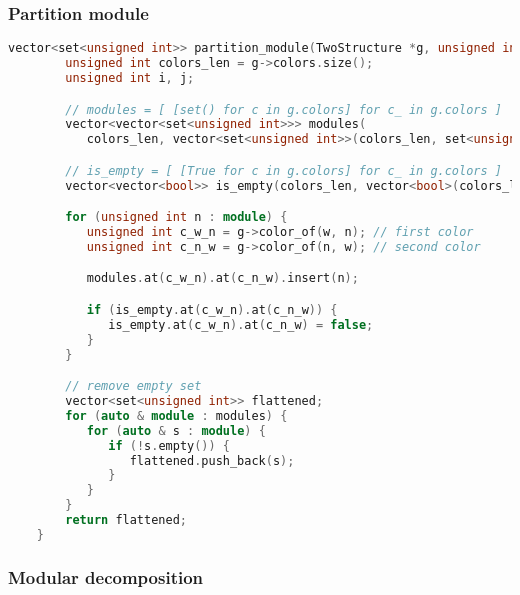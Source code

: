 \subsubsection{Partition module}

\begin{lstlisting}[language=C++, style=cpp, caption={Defining the Partition Module with C++}, label={lst:cpp-define-partition-module}, firstnumber=1]
    vector<set<unsigned int>> partition_module(TwoStructure *g, unsigned int w, const set<unsigned int>& module) {
        unsigned int colors_len = g->colors.size();
        unsigned int i, j;

        // modules = [ [set() for c in g.colors] for c_ in g.colors ]
        vector<vector<set<unsigned int>>> modules(
           colors_len, vector<set<unsigned int>>(colors_len, set<unsigned int>()));

        // is_empty = [ [True for c in g.colors] for c_ in g.colors ]
        vector<vector<bool>> is_empty(colors_len, vector<bool>(colors_len, true));

        for (unsigned int n : module) {
           unsigned int c_w_n = g->color_of(w, n); // first color
           unsigned int c_n_w = g->color_of(n, w); // second color

           modules.at(c_w_n).at(c_n_w).insert(n);

           if (is_empty.at(c_w_n).at(c_n_w)) {
              is_empty.at(c_w_n).at(c_n_w) = false;
           }
        }

        // remove empty set
        vector<set<unsigned int>> flattened;
        for (auto & module : modules) {
           for (auto & s : module) {
              if (!s.empty()) {
                 flattened.push_back(s);
              }
           }
        }
        return flattened;
    }
\end{lstlisting}

\subsubsection{Modular decomposition}


